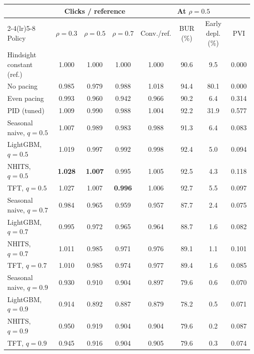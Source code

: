 \begin{tabular}{l@{\hskip 6pt}ccc@{\hskip 8pt}cccc}
\toprule
 & \multicolumn{3}{c}{Clicks / reference} & \multicolumn{4}{c}{At $\rho=0.5$} \\
\cmidrule(lr){2-4}\cmidrule(lr){5-8}
Policy & $\rho{=}0.3$ & $\rho{=}0.5$ & $\rho{=}0.7$ & Conv./ref. & BUR (\%) & Early depl. (\%) & PVI \\
\midrule
Hindsight constant (ref.) & 1.000 & 1.000 & 1.000 & 1.000 & 90.6 & 9.5 & 0.000 \\
\addlinespace[2pt]
No pacing & 0.985 & 0.979 & 0.988 & 1.018 & 94.4 & 80.1 & 0.000 \\
Even pacing & 0.993 & 0.960 & 0.942 & 0.966 & 90.2 & 6.4 & 0.314 \\
PID (tuned) & 1.009 & 0.990 & 0.988 & 1.004 & 92.2 & 31.9 & 0.577 \\
\addlinespace[2pt]
Seasonal naive, $q{=}0.5$ & 1.007 & 0.989 & 0.983 & 0.988 & 91.3 & 6.4 & 0.083 \\
LightGBM, $q{=}0.5$ & 1.019 & 0.997 & 0.992 & 0.998 & 92.4 & 5.0 & 0.094 \\
NHITS, $q{=}0.5$ & \textbf{1.028} & \textbf{1.007} & 0.995 & 1.005 & 92.5 & 4.3 & 0.118 \\
TFT, $q{=}0.5$ & 1.027 & 1.007 & \textbf{0.996} & 1.006 & 92.7 & 5.5 & 0.097 \\
\addlinespace[2pt]
Seasonal naive, $q{=}0.7$ & 0.984 & 0.965 & 0.959 & 0.957 & 87.7 & 2.4 & 0.075 \\
LightGBM, $q{=}0.7$ & 0.995 & 0.972 & 0.965 & 0.964 & 88.7 & 1.6 & 0.082 \\
NHITS, $q{=}0.7$ & 1.011 & 0.985 & 0.971 & 0.976 & 89.1 & 1.1 & 0.101 \\
TFT, $q{=}0.7$ & 1.010 & 0.985 & 0.974 & 0.977 & 89.4 & 1.6 & 0.085 \\
\addlinespace[2pt]
Seasonal naive, $q{=}0.9$ & 0.930 & 0.910 & 0.904 & 0.897 & 79.6 & 0.6 & 0.070 \\
LightGBM, $q{=}0.9$ & 0.914 & 0.892 & 0.887 & 0.879 & 78.2 & 0.5 & 0.071 \\
NHITS, $q{=}0.9$ & 0.950 & 0.919 & 0.904 & 0.904 & 79.6 & 0.2 & 0.087 \\
TFT, $q{=}0.9$ & 0.945 & 0.916 & 0.904 & 0.905 & 79.6 & 0.3 & 0.074 \\
\bottomrule
\end{tabular}
